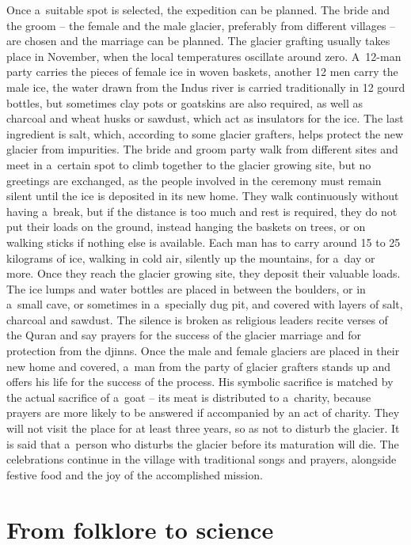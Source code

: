 Once a suitable spot is selected, the expedition can be planned. The bride and the groom – the female and the
male glacier, preferably from different villages – are chosen and the marriage can be planned. The glacier
grafting usually takes place in November, when the local temperatures oscillate around zero. A 12-man party
carries the pieces of female ice in woven baskets, another 12 men carry the male ice, the water drawn from the
Indus river is carried traditionally in 12 gourd bottles, but sometimes clay pots or goatskins are also
required, as well as charcoal and wheat husks or sawdust, which act as insulators for the ice. The last
ingredient is salt, which, according to some glacier grafters, helps protect the new glacier from impurities.
The bride and groom party walk from different sites and meet in a certain spot to climb together to the glacier
growing site, but no greetings are exchanged, as the people involved in the ceremony must remain silent until
the ice is deposited in its new home. They walk continuously without having a break, but if the distance is too
much and rest is required, they do not put their loads on the ground, instead hanging the baskets on trees, or
on walking sticks if nothing else is available. Each man has to carry around 15 to 25 kilograms of ice, walking
in cold air, silently up the mountains, for a day or more. Once they reach the glacier growing site, they
deposit their valuable loads. The ice lumps and water bottles are placed in between the boulders, or in a small
cave, or sometimes in a specially dug pit, and covered with layers of salt, charcoal and sawdust. The silence is
broken as religious leaders recite verses of the Quran and say prayers for the success of the glacier marriage
and for protection from the djinns. Once the male and female glaciers are placed in their new home and covered,
a man from the party of glacier grafters stands up and offers his life for the success of the process. His
symbolic sacrifice is matched by the actual sacrifice of a goat – its meat is distributed to a charity, because
prayers are more likely to be answered if accompanied by an act of charity. They will not visit the place for at
least three years, so as not to disturb the glacier. It is said that a person who disturbs the glacier before
its maturation will die. The celebrations continue in the village with traditional songs and prayers, alongside
festive food and the joy of the accomplished mission.

\section{From folklore to science}

